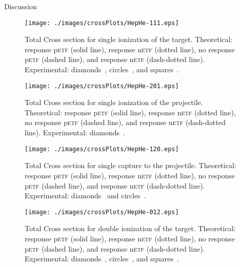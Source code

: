 \documentclass[aps, pra, reprint, groupedaddress, amsfonts,
               amsmath, amssymb, showpacs, nofootinbib]{revtex4-1}
\begin{document}
\begin{section}{Discussion \label{sec:disc}}

   \begin{figure}[htp]
      \centering
      \texttt{[image: ./images/crossPlots/HepHe-111.eps]}
      \caption{Total Cross section for single ionization of the target.
               Theoretical: response p\textsc{etf} (solid line), response n\textsc{etf} (dotted line),
                            no response p\textsc{etf} (dashed line), and response n\textsc{etf}
                            (dash-dotted line).
               Experimental: diamonds~\cite{Dub-89}, circles~\cite{FTFHLP-95}, and squares~\cite{DT-88}.
               \label{fig:cs111}}
   \end{figure}

   \begin{figure}[htp]
      \centering
      \texttt{[image: ./images/crossPlots/HepHe-201.eps]}
      \caption{Total Cross section for single ionization of the projectile.
               Theoretical: response p\textsc{etf} (solid line), response n\textsc{etf} (dotted line),
                            no response p\textsc{etf} (dashed line), and response n\textsc{etf}
                            (dash-dotted line).
               Experimental: diamonds~\cite{Dub-89}.
\label{fig:cs201}}
   \end{figure}

   \begin{figure}[htp]
      \centering
      \texttt{[image: ./images/crossPlots/HepHe-120.eps]}
      \caption{Total Cross section for single capture to the projectile.
               Theoretical: response p\textsc{etf} (solid line), response n\textsc{etf} (dotted line),
                            no response p\textsc{etf} (dashed line), and response n\textsc{etf}
                            (dash-dotted line).
               Experimental: diamonds~\cite{Dub-89} and circles~\cite{FTFHLP-95}.
 \label{fig:cs120}}
   \end{figure}

   \begin{figure}[htp]
      \centering
      \texttt{[image: ./images/crossPlots/HepHe-012.eps]}
      \caption{Total Cross section for double ionization of the target.
               Theoretical: response p\textsc{etf} (solid line), response n\textsc{etf} (dotted line),
                            no response p\textsc{etf} (dashed line), and response n\textsc{etf}
                            (dash-dotted line).
               Experimental: diamonds~\cite{Dub-89}, circles~\cite{FTFHLP-95}, and squares~\cite{DT-88}.
 \label{fig:cs012}}
   \end{figure}


\end{section}
\end{document}
